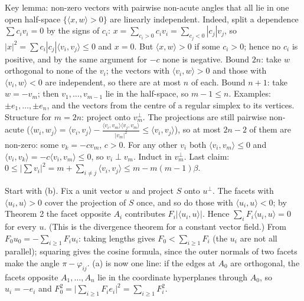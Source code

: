 \documentclass[11pt,a4paper]{article}
\begin{document}

 Key lemma: non-zero vectors with pairwise non-acute angles that all lie in one open half-space $\{\langle x,w\rangle>0\}$ are linearly independent. Indeed, split a dependence $\sum c_iv_i=0$ by the signs of $c_i$: $x=\sum_{c_i>0}c_iv_i=\sum_{c_j<0}|c_j|v_j$, so $|x|^2=\sum c_i|c_j|\langle v_i,v_j\rangle\le0$ and $x=0$. But $\langle x,w\rangle>0$ if some $c_i>0$; hence no $c_i$ is positive, and by the same argument for $-c$ none is negative.
 Bound $2n$: take $w$ orthogonal to none of the $v_i$; the vectors with $\langle v_i,w\rangle>0$ and those with $\langle v_i,w\rangle<0$ are independent, so there are at most $n$ of each. Bound $n+1$: take $w=-v_m$; then $v_1,\dots,v_{m-1}$ lie in the half-space, so $m-1\le n$. Examples: $\pm e_1,\dots,\pm e_n$, and the vectors from the centre of a regular simplex to its vertices.
 Structure for $m=2n$: project onto $v_m^\perp$. The projections are still pairwise non-acute ($\langle w_i,w_j\rangle=\langle v_i,v_j\rangle-\frac{\langle v_i,v_m\rangle\langle v_j,v_m\rangle}{|v_m|^2}\le\langle v_i,v_j\rangle$), so at most $2n-2$ of them are non-zero: some $v_k=-cv_m$, $c>0$. For any other $v_i$ both $\langle v_i,v_m\rangle\le0$ and $\langle v_i,v_k\rangle=-c\langle v_i,v_m\rangle\le0$, so $v_i\perp v_m$. Induct in $v_m^\perp$.
 Last claim: $0\le\bigl|\sum v_i\bigr|^2=m+\sum_{i\ne j}\langle v_i,v_j\rangle\le m-m(m-1)\beta$.

 Start with (b). Fix a unit vector $u$ and project $S$ onto $u^\perp$. The facets with $\langle u_i,u\rangle>0$ cover the projection of $S$ once, and so do those with $\langle u_i,u\rangle<0$; by Theorem 2 the facet opposite $A_i$ contributes $F_i|\langle u_i,u\rangle|$. Hence $\sum_iF_i\langle u_i,u\rangle=0$ for every $u$. (This is the divergence theorem for a constant vector field.)
 From $F_0u_0=-\sum_{i\ge1}F_iu_i$: taking lengths gives $F_0<\sum_{i\ge1}F_i$ (the $u_i$ are not all parallel); squaring gives the cosine formula, since the outer normals of two facets make the angle $\pi-\varphi_{ij}$.
 (a) is now one line: if the edges at $A_0$ are orthogonal, the facets opposite $A_1,\dots,A_n$ lie in the coordinate hyperplanes through $A_0$, so $u_i=-e_i$ and $F_0^2=\bigl|\sum_{i\ge1}F_ie_i\bigr|^2=\sum_{i\ge1}F_i^2$.
\end{document}
